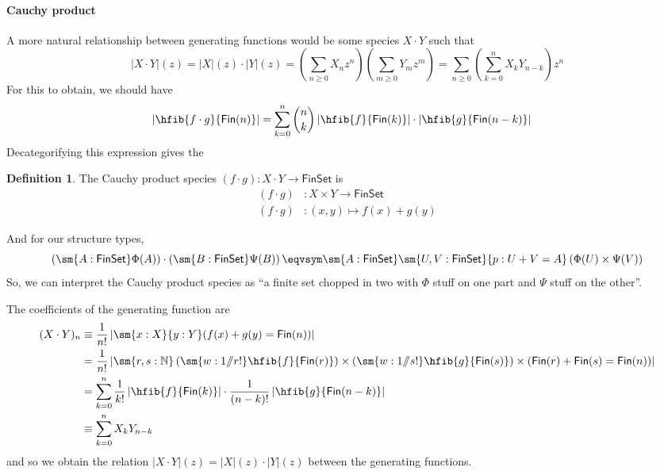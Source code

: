 \documentclass[fleqn]{article}
\newcommand{\gf}[1]{\abs{#1}\!(z)}
\newcommand{\fin}{\mathsf{Fin}}
\newcommand{\finset}{\mathsf{FinSet}}
\newcommand{\abs}[1]{\left\lvert #1 \right\rvert}
\newcommand{\sslash}{/\!\!/}
\theoremstyle{theorem}
\theoremstyle{definition}
\newtheorem{defn}{Definition}[section]
\begin{document}
\paragraph{Cauchy product}
A more natural relationship between generating functions would be some species
$X \cdot Y$ such that
\[
  \gf{X \cdot Y}
  =
  \gf{X} \cdot \gf{Y}
  =
  \left(\sum_{n\geq0} X_{n} z^{n}\right)
  \left(\sum_{m\geq0} Y_{m} z^{m}\right)
  =
  \sum_{n\geq0}
  \left(
    \sum_{k=0}^{n} X_{k}Y_{n-k}
  \right) z^{n} 
\]
For this to obtain, we should have
\begin{align*}
  \abs{\hfib{f \cdot g}{\fin(n)}}
  &=
  \sum_{k=0}^{n}
  \binom{n}{k}
    \abs{\hfib{f}{\fin(k)}}
    \cdot
    \abs{\hfib{g}{\fin(n-k)}}
\end{align*}
Decategorifying this expression gives the
\begin{defn}
  The Cauchy product species $(f \cdot g) : X \cdot Y \to \finset$ is
  \begin{align*}
    (f \cdot g) &: X \times Y \to \finset \\
    (f \cdot g) &: (x, y) \mapsto f(x) + g(y)
  \end{align*}
\end{defn}
\noindent
And for our structure types,
\[
  \left(\sm{A : \finset}\Phi(A)\right) 
  \cdot
  \left(\sm{B : \finset}\Psi(B)\right)
  \eqvsym
  \sm{A : \finset}\sm{U, V : \finset}{p : U + V = A} \left(
    \Phi(U) \times \Psi(V)
  \right)
\]
So, we can interpret the Cauchy product species as ``a finite set chopped in
two with $\Phi$ stuff on one part and $\Psi$ stuff on the other''.

The coefficients of the generating function are
\begin{align*}
  (X \cdot Y)_{n}
  &\equiv
  \frac{1}{n!}
  \abs{\sm{x:X}{y:Y}(f(x) + g(y) = \fin(n))}
  \\&=
  \frac{1}{n!}
  \abs{\sm{r, s : \mathbb{N}}
    \left(\sm{w : 1\sslash r!}\hfib{f}{\fin(r)}\right)
    \times 
    \left(\sm{w : 1\sslash s!}\hfib{g}{\fin(s)}\right)
    \times
    (\fin(r) + \fin(s) = \fin(n))
    }
  \\&=
  \sum_{k=0}^{n}\frac{1}{k!}\abs{\hfib{f}{\fin(k)}} 
    \cdot \frac{1}{(n-k)!}\abs{\hfib{g}{\fin(n-k)}}
  \\&\equiv
  \sum_{k=0}^{n}X_{k}Y_{n-k}
\end{align*}
and so we obtain the relation $\gf{X \cdot Y} = \gf{X} \cdot \gf{Y}$ between
the generating functions.
\end{document}
